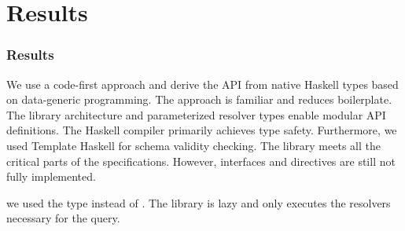 \section{Results}

\begin{frame}\frametitle{Results}

\begin{itemize}
   We use a code-first approach and derive the API from native Haskell types based on data-generic programming. The approach is familiar and reduces boilerplate. The library architecture and parameterized resolver types enable modular API definitions.
   The Haskell compiler primarily achieves type safety. Furthermore, we used Template Haskell for schema validity checking. The library meets all the critical parts of the specifications. However, interfaces and directives are still not fully implemented. 

   we used the type  instead of . The library is lazy and only executes the resolvers necessary for the query. 

\end{itemize}
\end{frame}

